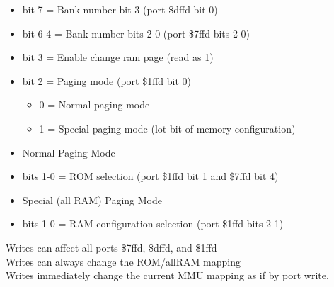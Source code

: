\begin{itemize}
\item bit 7 = Bank number bit 3 (port \$dffd bit 0)
\item bit 6-4 = Bank number bits 2-0 (port \$7ffd bits 2-0)
\item bit 3 = Enable change ram page (read as 1)
\item bit 2 = Paging mode (port \$1ffd bit 0)
\begin{itemize}
\item 0 = Normal paging mode
\item 1 = Special paging mode (lot bit of memory configuration)
\end{itemize}
\item[] Normal Paging Mode
\item bits 1-0 = ROM selection (port \$1ffd bit 1 and \$7ffd bit 4)
\item[] Special (all RAM) Paging Mode
\item bits 1-0 = RAM configuration selection (port \$1ffd bits 2-1)
\end{itemize}
Writes can affect all ports \$7ffd, \$dffd, and \$1ffd\\
Writes can always change the ROM/allRAM mapping\\
Writes immediately change the current MMU mapping as if by port write.

